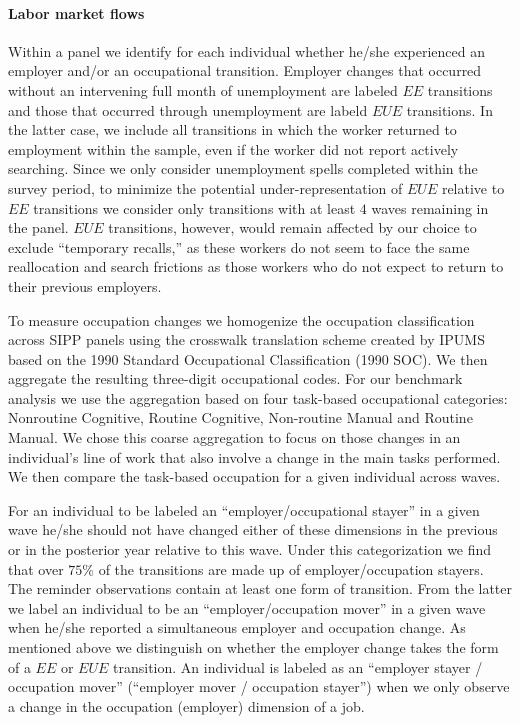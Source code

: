 \documentclass[12pt]{article}
\theoremstyle{definition}
\begin{document}
\paragraph{Labor market flows} Within a panel we identify for each individual whether he/she experienced an employer and/or an occupational transition. Employer changes that occurred without an intervening full month of unemployment are labeled $EE$ transitions and those that occurred through unemployment are labeld $EUE$ transitions. In the latter case, we include all transitions in which the worker returned to employment within the sample, even if the worker did not report actively searching. Since we only consider unemployment spells completed within the survey period, to minimize the potential under-representation of $EUE$ relative to $EE$ transitions we consider only transitions with at least $4$ waves remaining in the panel. $EUE$ transitions, however, would remain affected by our choice to exclude ``temporary recalls,'' as these workers do not seem to face the same reallocation and search frictions as those workers who do not expect to return to their previous employers.

To measure occupation changes we homogenize the occupation classification across SIPP panels  using the crosswalk translation scheme created by IPUMS based on the 1990 Standard Occupational Classification (1990 SOC). We then aggregate the resulting three-digit occupational codes. For our benchmark analysis we use the aggregation based on four task-based occupational categories: Nonroutine Cognitive, Routine Cognitive, Non-routine Manual and Routine Manual. We chose this coarse aggregation to focus on those changes in an individual's line of work that also involve a change in the main tasks performed. We then compare the task-based occupation for a given individual across waves.

For an individual to be labeled an ``employer/occupational stayer'' in a given wave he/she should not have changed either of these dimensions in the previous or in the posterior year relative to this wave. Under this categorization we find that over $75\%$ of the transitions are made up of employer/occupation stayers. The reminder observations contain at least one form of transition. From the latter we label an individual to be an ``employer/occupation mover'' in a given wave when he/she reported a simultaneous employer and occupation change. As mentioned above we distinguish on whether the employer change takes the form of a $EE$ or $EUE$ transition. An individual is labeled as an ``employer stayer / occupation mover'' (``employer mover / occupation stayer'') when we only observe a change in the occupation (employer) dimension of a job.
\end{document}
